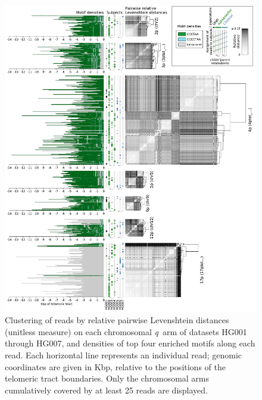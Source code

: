 \documentclass{article}
\begin{document}
                \begin{figure}[h!] \centering %
                \includegraphics[height=.88\textheight,width=\textwidth,keepaspectratio]{../figures/Figure_4.pdf} %
                \caption{ %
                    \small Clustering of reads by relative pairwise Levenshtein distances (unitless measure) %
                    on each chromosomal \mbox{\textit{q} arm} of datasets HG001 through HG007, %
                    and densities of top four enriched motifs along each read. %
                    Each horizontal line represents an individual read; %
                    genomic coordinates are given in Kbp, relative to the positions of the telomeric tract boundaries. %
                    Only the chromosomal arms cumulatively covered by at least 25 reads are displayed. %
                } %
                \label{fig:haplotypes} %
                \end{figure} %
\end{document}
